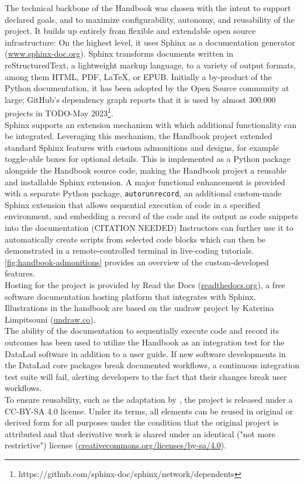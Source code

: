 The technical backbone of the Handbook was chosen with the intent to support declared goals, and to maximize configurability, autonomy, and reusability of the project.
It builds up entirely from flexible and extendable open source infrastructure:
On the highest level, it uses Sphinx as a documentation generator (\href{https://www.sphinx-doc.org/en/master/}{www.sphinx-doc.org}).
Sphinx transforms documents written in reStructuredText, a lightweight markup language, to a variety of output formats, among them HTML, PDF, \LaTeX, or EPUB.
Initially a by-product of the Python documentation, it has been adopted by the Open Source community at large;
GitHub's dependency graph reports that it is used by almost 300.000 projects in TODO-May 2023\footnote{https://github.com/sphinx-doc/sphinx/network/dependents}. \\
Sphinx supports an extension mechanism with which additional functionality can be integrated.
Leveraging this mechanism, the Handbook project extended standard Sphinx features with custom admonitions and designs, for example toggle-able boxes for optional details.
This is implemented as a Python package alongside the Handbook source code, making the Handbook project a reusable and installable Sphinx extension.
A major functional enhancement is provided with a separate Python package, \texttt{autorunrecord}, an additional custom-made Sphinx extension that allows sequential execution of code in a specified environment, and embedding a record of the code and its output as code snippets into the documentation (CITATION NEEDED)
Instructors can further use it to automatically create scripts from selected code blocks which can then be demonstrated in a remote-controlled terminal in live-coding tutorials.
\cref{fig:handbook-admonitions} provides an overview of the custom-developed features. \\
Hosting for the project is provided by Read the Docs (\href{https://readthedocs.org/}{readthedocs.org}), a free software documentation hosting platform that integrates with Sphinx.
Illustrations in the handbook are based on the undraw project by Katerina Limpitsouni (\href{https://undraw.co/}{undraw.co}). \\
The ability of the documentation to sequentially execute code and record its outcomes has been used to utilize the Handbook as an integration test for the DataLad software in addition to a user guide.
If new software developments in the DataLad core packages break documented workflows, a continuous integration test suite will fail, alerting developers to the fact that their changes break user workflows. \\
To ensure reusability, such as the adaptation by \citet{brooks2021handbook}, the project is released under a CC-BY-SA 4.0 license.
Under its terms, all elements can be reused in original or derived form for all purposes under the condition that the original project is attributed and that derivative work is shared under an identical ("not more restrictive") license (\href{https://creativecommons.org/licenses/by-sa/4.0/}{creativecommons.org/licenses/by-sa/4.0}).

